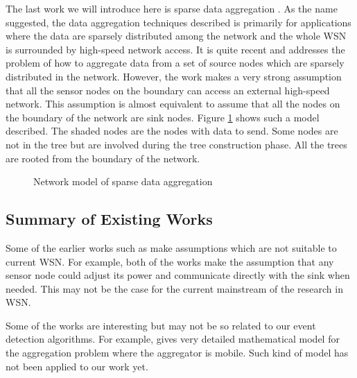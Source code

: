 The last work we will introduce here is sparse data aggregation \cite{doubleruling}. As the name suggested, the data aggregation techniques described is primarily for applications where the data are sparsely distributed among the network and the whole WSN is surrounded by high-speed network access. It is quite recent and addresses the problem of how to aggregate data from a set of source nodes which are sparsely distributed in the network. However, the work makes a very strong assumption that all the sensor nodes on the boundary can access an external high-speed network. This assumption is almost equivalent to assume that all the nodes on the boundary of the network are sink nodes. Figure \ref{fig:doubleruling} shows such a model described. The shaded nodes are the nodes with data to send. Some nodes are not in the tree but are involved during the tree construction phase. All the trees are rooted from the boundary of the network.

\begin{figure}
\centering
{}
\caption{Network model of sparse data aggregation}
\label{fig:doubleruling}
\end{figure}

\subsection{Summary of Existing Works}
Some of the earlier works such as \cite{leach, pegasis} make assumptions which are not suitable to current WSN. For example, both of the works make the assumption that any sensor node could adjust its power and communicate directly with the sink when needed. This may not be the case for the current mainstream of the research in WSN.

Some of the works are interesting but may not be so related to our event detection algorithms. For example, \cite{dctc} gives very detailed mathematical model for the aggregation problem where the aggregator is mobile. Such kind of model has not been applied to our work yet.


